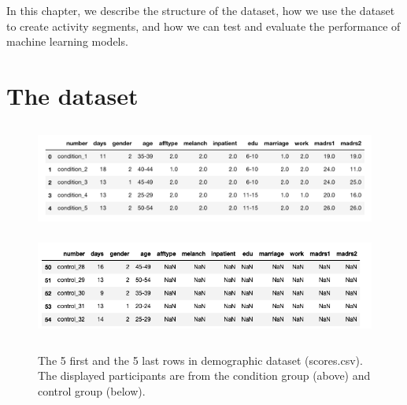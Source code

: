 In this chapter, we describe the structure of the dataset, how we use the dataset to create activity segments, and how we can test and evaluate the performance of machine learning models.

\section{The dataset}

\begin{figure}[!ht]
  \centering
    \includegraphics[height=3.5cm]{img/demographics.png}
    \includegraphics[height=3.5cm]{img/demographics_control.png}
    \caption{The 5 first and the 5 last rows in demographic dataset (scores.csv). The displayed participants are from the condition group (above) and control group (below).}
    \label{figure:demographics}
\end{figure}

